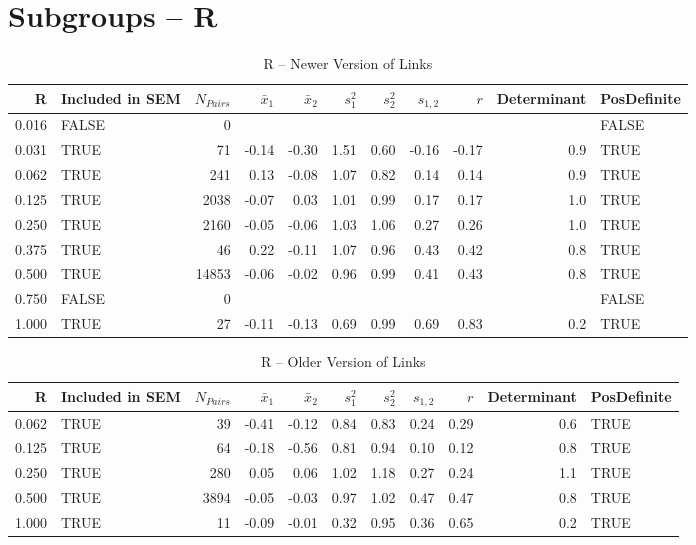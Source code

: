 \documentclass{article}\usepackage[]{graphicx}\usepackage[]{color}
\begin{document}
\section{Subgroups --  R }%
\begin{table}[ht]
\centering
\begin{tabular}{rlrrrrrrrrl}
  \hline
R & Included in SEM & $N_{Pairs}$ & $\bar{x}_1$ & $\bar{x}_2$ & $s_1^2$ & $s_2^2$ & $s_{1,2}$ & $r$ & Determinant & PosDefinite \\ 
  \hline
0.016 & FALSE & 0 &  &  &  &  &  &  &  & FALSE \\ 
  0.031 & TRUE & 71 & -0.14 & -0.30 & 1.51 & 0.60 & -0.16 & -0.17 & 0.9 & TRUE \\ 
  0.062 & TRUE & 241 & 0.13 & -0.08 & 1.07 & 0.82 & 0.14 & 0.14 & 0.9 & TRUE \\ 
  0.125 & TRUE & 2038 & -0.07 & 0.03 & 1.01 & 0.99 & 0.17 & 0.17 & 1.0 & TRUE \\ 
  0.250 & TRUE & 2160 & -0.05 & -0.06 & 1.03 & 1.06 & 0.27 & 0.26 & 1.0 & TRUE \\ 
  0.375 & TRUE & 46 & 0.22 & -0.11 & 1.07 & 0.96 & 0.43 & 0.42 & 0.8 & TRUE \\ 
  0.500 & TRUE & 14853 & -0.06 & -0.02 & 0.96 & 0.99 & 0.41 & 0.43 & 0.8 & TRUE \\ 
  0.750 & FALSE & 0 &  &  &  &  &  &  &  & FALSE \\ 
  1.000 & TRUE & 27 & -0.11 & -0.13 & 0.69 & 0.99 & 0.69 & 0.83 & 0.2 & TRUE \\ 
   \hline
\end{tabular}
\caption{R -- Newer Version of Links} 
\end{table}
\begin{table}[ht]
\centering
\begin{tabular}{rlrrrrrrrrl}
  \hline
R & Included in SEM & $N_{Pairs}$ & $\bar{x}_1$ & $\bar{x}_2$ & $s_1^2$ & $s_2^2$ & $s_{1,2}$ & $r$ & Determinant & PosDefinite \\ 
  \hline
0.062 & TRUE & 39 & -0.41 & -0.12 & 0.84 & 0.83 & 0.24 & 0.29 & 0.6 & TRUE \\ 
  0.125 & TRUE & 64 & -0.18 & -0.56 & 0.81 & 0.94 & 0.10 & 0.12 & 0.8 & TRUE \\ 
  0.250 & TRUE & 280 & 0.05 & 0.06 & 1.02 & 1.18 & 0.27 & 0.24 & 1.1 & TRUE \\ 
  0.500 & TRUE & 3894 & -0.05 & -0.03 & 0.97 & 1.02 & 0.47 & 0.47 & 0.8 & TRUE \\ 
  1.000 & TRUE & 11 & -0.09 & -0.01 & 0.32 & 0.95 & 0.36 & 0.65 & 0.2 & TRUE \\ 
   \hline
\end{tabular}
\caption{R -- Older Version of Links} 
\end{table}
\newpage 
\end{document}

